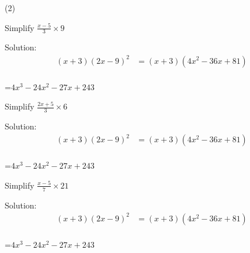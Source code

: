 \clearpage


\begin{mtask}[resume](2)
   \task \begin{exercise} Simplify $\frac{x-5}{3}\times 9$
              \begin{envSolution}
			      Solution:
			      \begin{align*}
			        (x+3)(2x-9)^2  &= (x+3)(4x^2-36x+81)                      \\[10pt]    
				 \end{align*}
                 \begin{shortsolution}  
				       =$4x^3-24x^2-27x+243$
			     \end{shortsolution}				 
               \end{envSolution}
         \end{exercise}

   \task \begin{exercise} Simplify $\frac{2x+5}{3}\times 6$
              \begin{envSolution}
			      Solution:
			      \begin{align*}
			        (x+3)(2x-9)^2  &= (x+3)(4x^2-36x+81)                      \\[10pt]    
				 \end{align*}
                 \begin{shortsolution}  
				       =$4x^3-24x^2-27x+243$
			     \end{shortsolution}				 
               \end{envSolution}
         \end{exercise}

   \task \begin{exercise} Simplify $\frac{x-5}{7}\times 21$
              \begin{envSolution}
			      Solution:
			      \begin{align*}
			        (x+3)(2x-9)^2  &= (x+3)(4x^2-36x+81)                      \\[10pt]    
				 \end{align*}
                 \begin{shortsolution}  
				       =$4x^3-24x^2-27x+243$
			     \end{shortsolution}				 
               \end{envSolution}
         \end{exercise}

\end{mtask}



